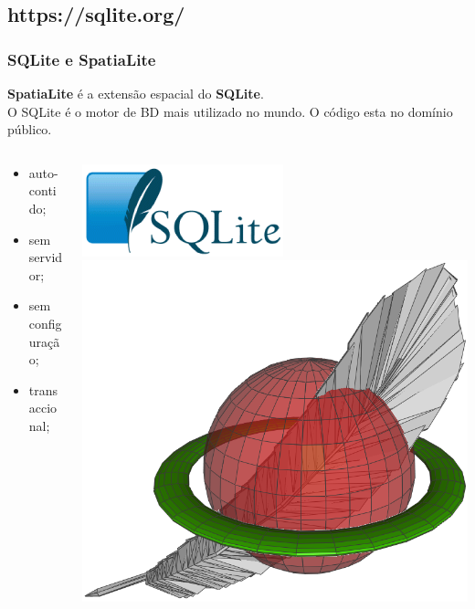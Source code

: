 \documentclass[hyperref={pdfpagelabels=true}]{beamer}
\begin{document}
\subsection{https://sqlite.org/}
\begin{frame}
\frametitle{SQLite e SpatiaLite}
\textbf{SpatiaLite} \'{e} a extens\~{a}o espacial do \textbf{SQLite}.\\
O SQLite \'{e} o motor de BD mais utilizado no mundo. O c\'{o}digo esta no dom\'{i}nio p\'{u}blico.\\
\begin{columns}
  \begin{column}{7cm}
    \begin{itemize}
      \item<2-> auto-contido;
      \item<3-> sem servidor;
      \item<4-> sem configura\c{c}\~{a}o;
      \item<5-> transaccional;      
    \end{itemize}    
  \end{column}
  \begin{column}{10cm}
    \includegraphics[scale=0.3]{sqlite.png}
    \includegraphics[scale=0.1]{spatialite.png}       
  \end{column}  
\end{columns} 
\end{frame}
\end{document}
